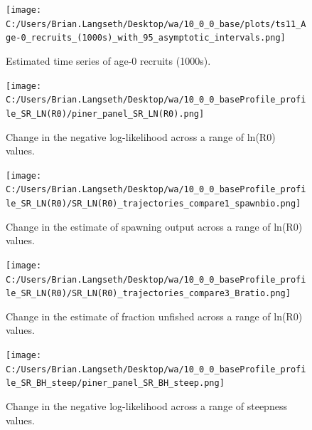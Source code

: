 \documentclass[11pt,
  english,
  a4paper,
]{article}
\begin{document}
\begin{figure}
\centering
\texttt{[image: C:/Users/Brian.Langseth/Desktop/wa/10\_0\_0\_base/plots/ts11\_Age-0\_recruits\_(1000s)\_with\_95\_asymptotic\_intervals.png]}
\caption{Estimated time series of age-0 recruits (1000s).\label{fig:recruits}}
\end{figure}

\tagmcend\tagstructend


\begin{figure}
\centering
\texttt{[image: C:/Users/Brian.Langseth/Desktop/wa/10\_0\_0\_baseProfile\_profile\_SR\_LN(R0)/piner\_panel\_SR\_LN(R0).png]}
\caption{Change in the negative log-likelihood across a range of ln(R0) values.\label{fig:r0-profile}}
\end{figure}

\tagmcend\tagstructend


\begin{figure}
\centering
\texttt{[image: C:/Users/Brian.Langseth/Desktop/wa/10\_0\_0\_baseProfile\_profile\_SR\_LN(R0)/SR\_LN(R0)\_trajectories\_compare1\_spawnbio.png]}
\caption{Change in the estimate of spawning output across a range of ln(R0) values.\label{fig:r0-ssb}}
\end{figure}

\tagmcend\tagstructend


\begin{figure}
\centering
\texttt{[image: C:/Users/Brian.Langseth/Desktop/wa/10\_0\_0\_baseProfile\_profile\_SR\_LN(R0)/SR\_LN(R0)\_trajectories\_compare3\_Bratio.png]}
\caption{Change in the estimate of fraction unfished across a range of ln(R0) values.\label{fig:r0-depl}}
\end{figure}

\tagmcend\tagstructend


\begin{figure}
\centering
\texttt{[image: C:/Users/Brian.Langseth/Desktop/wa/10\_0\_0\_baseProfile\_profile\_SR\_BH\_steep/piner\_panel\_SR\_BH\_steep.png]}
\caption{Change in the negative log-likelihood across a range of steepness values.\label{fig:h-profile}}
\end{figure}
\end{document}
